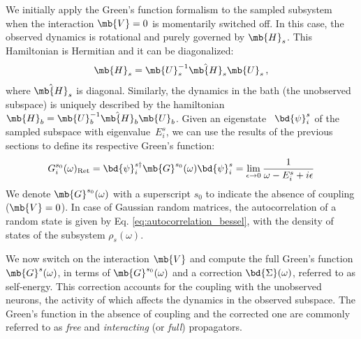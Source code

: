 We initially apply the Green's function formalism to the sampled subsystem when the interaction $\mb{V}=0$ is momentarily switched off. In this case, the observed dynamics is rotational and purely governed by $\mb{H}_s$. This Hamiltonian is Hermitian and it can be diagonalized:
$$
\mb{H}_s = \mb{U}_s^{-1} \hat{\mb{H}}_s\mb{U}_s \,,
$$
where $\hat{\mb{H}}_s$ is diagonal. Similarly, the dynamics in the bath (the unobserved subspace) is uniquely described by the hamiltonian
$
\mb{H}_b = \mb{U}_b^{-1} \hat{\mb{H}}_b\mb{U}_b
$.
Given an eigenstate~ $\bd{\psi}_i^s$ of the sampled subspace with eigenvalue~$E_i^s$, we can use the results of the previous sections to define its respective Green's function:
$$
G^{s_0}_i(\omega)_{\text{Ret}} = \bd{\psi}_i^{s\dagger} \mb{G}^{s_0}(\omega) \bd{\psi}^s_i =  \lim_{\epsilon \to 0}  \frac{1}{\omega -E^s_i + i \epsilon}
$$
We denote $\mb{G}^{s_0}(\omega)$ with a superscript ${s_0}$ to indicate the absence of coupling ($\mb{V}=0$).
In case of Gaussian random matrices, the autocorrelation of a random state is given by Eq. \ref{eq:autocorrelation_bessel}, with the density of states of the subsystem $\rho_s(\omega)$.

We now switch on the interaction $\mb{V}$ and compute the full Green's function $\mb{G}^{s}(\omega)$, in terms of $\mb{G}^{s_0}(\omega)$ and a correction $\bd{\Sigma}(\omega)$, referred to as self-energy. This correction accounts for the coupling with the unobserved neurons, the activity of which affects the dynamics in the observed subspace. The Green's function in the absence of coupling and the corrected one are commonly referred to as \textit{free} and \textit{interacting} (or \textit{full}) propagators.

